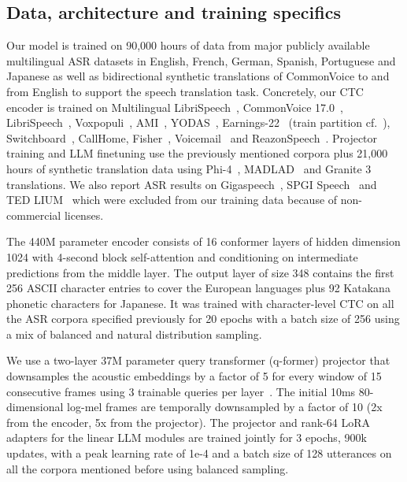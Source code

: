 \documentclass[cameraready]{Interspeech}
\begin{document}
\subsection{Data, architecture and training specifics}
Our model is trained on 90,000 hours of data from major publicly available multilingual ASR datasets in English, French, German, Spanish, Portuguese and Japanese as well as bidirectional synthetic translations of CommonVoice to and from English to support the speech translation task. Concretely, our CTC encoder is trained on Multilingual LibriSpeech~\cite{pratap2020mls}, CommonVoice 17.0~\cite{ardila2019common}, LibriSpeech~\cite{panayotov2015librispeech}, Voxpopuli~\cite{wang2021voxpopuli}, AMI~\cite{kraaij2005ami}, YODAS~\cite{li2023yodas}, Earnings-22~\cite{delrio2022earnings22} (train partition cf.~\cite{gandhi2022esbbenchmarkmultidomainendtoend}), Switchboard~\cite{godfrey1992switchboard}, CallHome, Fisher~\cite{cieri2004fisher}, Voicemail~\cite{padmanabhan2002automatic} and ReazonSpeech~\cite{yin2023reazonspeech}. Projector training and LLM finetuning use the previously mentioned corpora plus 21,000 hours of synthetic translation data using Phi-4~\cite{abdin2024phi}, MADLAD~\cite{kudugunta2023madlad} and Granite 3~\cite{granite2024granite}  translations. We also report ASR results on Gigaspeech~\cite{chen2021gigaspeech}, SPGI Speech~\cite{o2021spgispeech} and TED LIUM~\cite{rousseau2012ted} which were excluded from our training data because of non-commercial licenses.

The 440M parameter encoder consists of 16 conformer layers of hidden dimension 1024 with 4-second block self-attention and conditioning on intermediate predictions from the middle layer. The output layer of size 348 contains the first 256 ASCII character entries to cover the European languages plus 92 Katakana phonetic characters for Japanese. It was trained with character-level CTC on all the ASR corpora specified previously for 20 epochs with a batch size of 256 using a mix of balanced and natural distribution sampling. 

We use a two-layer 37M parameter query transformer (q-former) projector that downsamples the acoustic embeddings by a factor of 5 for every window of 15 consecutive frames using 3 trainable queries per layer~\cite{tang2023salmonn}. The initial 10ms 80-dimensional log-mel frames are temporally downsampled by a factor of 10 (2x from the encoder, 5x from the projector). The projector and rank-64 LoRA adapters for the linear LLM modules are trained jointly for 3 epochs, 900k updates, with a peak learning rate of 1e-4 and a batch size of 128 utterances on all the corpora mentioned before using balanced sampling.
\end{document}
